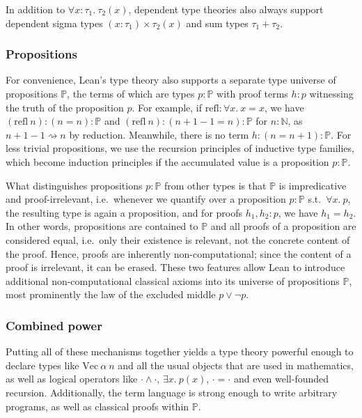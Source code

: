 In addition to $\forall x : \tau_1.\ \tau_2(x)$, dependent type theories also always support dependent sigma types $(x : \tau_1) \times \tau_2(x)$ and sum types $\tau_1 + \tau_2$.

\subsubsection{Propositions}
For convenience, Lean's type theory also supports a separate type universe of propositions $\mathbb{P}$, the terms of which are types $p : \mathbb{P}$ with proof terms $h : p$ witnessing the truth of the proposition $p$. For example, if $\mathrm{refl} : \forall x.\ x = x$, we have $(\mathrm{refl}\ n) : (n = n) : \mathbb{P}$ and $(\mathrm{refl}\ n) : (n + 1 - 1 = n) : \mathbb{P}$ for $n : \mathbb{N}$, as $n + 1 - 1 \rightsquigarrow n$ by reduction. Meanwhile, there is no term $h : (n = n + 1) : \mathbb{P}$. For less trivial propositions, we use the recursion principles of inductive type families, which become induction principles if the accumulated value is a proposition $p : \mathbb{P}$. 

What distinguishes propositions $p : \mathbb{P}$ from other types is that $\mathbb{P}$ is impredicative and proof-irrelevant, i.e.\ whenever we quantify over a proposition $p : \mathbb{P}$ s.t.\ $\forall x.\ p$, the resulting type is again a proposition, and for proofs $h_1, h_2 : p$, we have $h_1 = h_2$. In other words, propositions are contained to $\mathbb{P}$ and all proofs of a proposition are considered equal, i.e.\ only their existence is relevant, not the concrete content of the proof. Hence, proofs are inherently non-computational; since the content of a proof is irrelevant, it can be erased. These two features allow Lean to introduce additional non-computational classical axioms into its universe of propositions $\mathbb{P}$, most prominently the law of the excluded middle $p \lor \lnot p$.

\subsubsection{Combined power}
Putting all of these mechanisms together yields a type theory powerful enough to declare types like $\mathrm{Vec}\ \alpha\ n$ and all the usual objects that are used in mathematics, as well as logical operators like $\cdot \land \cdot$, $\exists x.\ p(x)$, $\cdot = \cdot$ and even well-founded recursion. Additionally, the term language is strong enough to write arbitrary programs, as well as classical proofs within $\mathbb{P}$.

